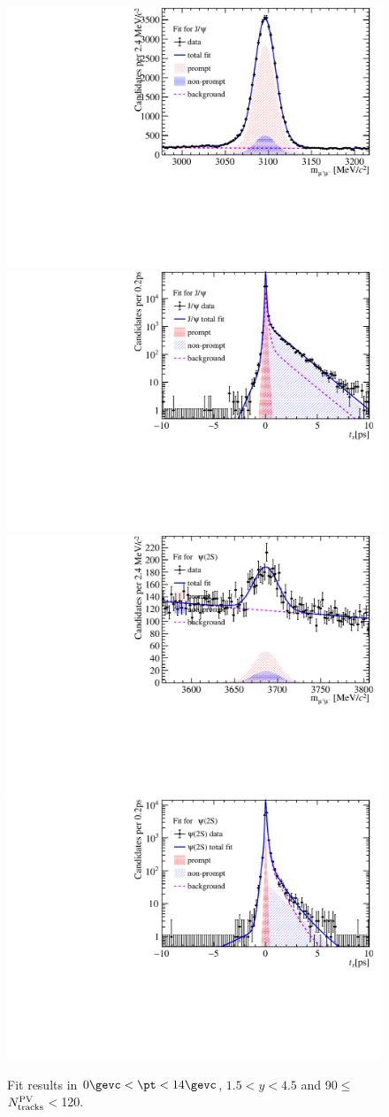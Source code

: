 \begin{figure}[H]
\begin{center}
\includegraphics[width=0.45\linewidth]{pdf/pPb/Workdir/TwoDimFit/ProjMass/Jpsi_n4y1pt1.pdf}
\includegraphics[width=0.45\linewidth]{pdf/pPb/Workdir/TwoDimFit/ProjTz/Jpsi_n4y1pt1.pdf}
\vspace*{-0.5cm}
\includegraphics[width=0.45\linewidth]{pdf/pPb/Workdir/TwoDimFit/ProjMass/Psi2S_n4y1pt1.pdf}
\includegraphics[width=0.45\linewidth]{pdf/pPb/Workdir/TwoDimFit/ProjTz/Psi2S_n4y1pt1.pdf}
\vspace*{-0.5cm}
\end{center}
\caption{Fit results in $0\gevc<\pt<14\gevc$, $1.5<y<4.5$ and 90$\leq$$N^{\rm PV}_{\rm tracks}$$<$120.}
\end{figure}
